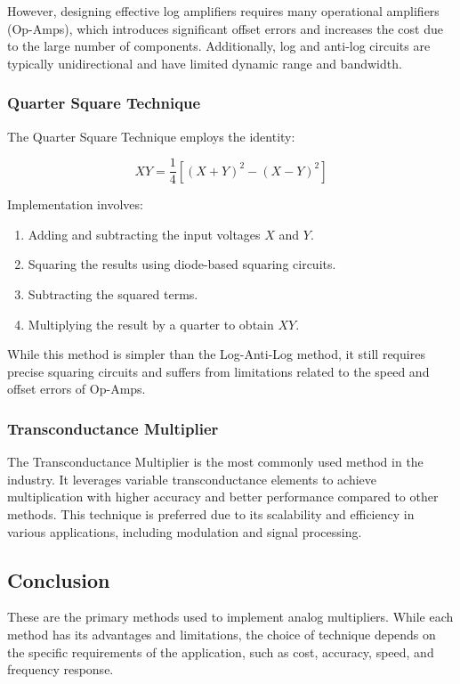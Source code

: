 However, designing effective log amplifiers requires many operational amplifiers (Op-Amps), which introduces significant offset errors and increases the cost due to the large number of components. Additionally, log and anti-log circuits are typically unidirectional and have limited dynamic range and bandwidth.

\subsubsection*{Quarter Square Technique}

The Quarter Square Technique employs the identity:

\[
XY = \frac{1}{4} \left[(X + Y)^2 - (X - Y)^2\right]
\]

Implementation involves:

\begin{enumerate}
    \item Adding and subtracting the input voltages \( X \) and \( Y \).
    \item Squaring the results using diode-based squaring circuits.
    \item Subtracting the squared terms.
    \item Multiplying the result by a quarter to obtain \( XY \).
\end{enumerate}

While this method is simpler than the Log-Anti-Log method, it still requires precise squaring circuits and suffers from limitations related to the speed and offset errors of Op-Amps.

\subsubsection*{Transconductance Multiplier}

The Transconductance Multiplier is the most commonly used method in the industry. It leverages variable transconductance elements to achieve multiplication with higher accuracy and better performance compared to other methods. This technique is preferred due to its scalability and efficiency in various applications, including modulation and signal processing.

\subsection*{Conclusion}

These are the primary methods used to implement analog multipliers. While each method has its advantages and limitations, the choice of technique depends on the specific requirements of the application, such as cost, accuracy, speed, and frequency response.

